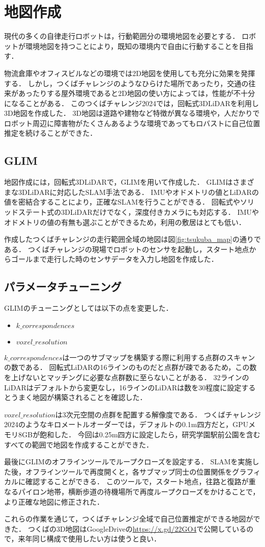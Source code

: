 \section{地図作成}
現代の多くの自律走行ロボットは，行動範囲分の環境地図を必要とする．
ロボットが環境地図を持つことにより，既知の環境内で自由に行動することを目指す．

物流倉庫やオフィスビルなどの環境では2D地図を使用しても充分に効果を発揮する．
しかし，つくばチャレンジのようなひらけた場所であったり，交通の往来があったりする屋外環境であると2D地図の使い方によっては，性能が不十分になることがある．
このつくばチャレンジ2024では，回転式3DLiDARを利用し3D地図を作成した．
3D地図は道路や建物など特徴が異なる環境や，人だかりでロボット周辺に障害物がたくさんあるような環境であってもロバストに自己位置推定を続けることができた．

\subsection{GLIM}
地図作成には，回転式3DLiDARで，GLIM\cite{GLIM}を用いて作成した．
GLIMはさまざまな3DLiDARに対応したSLAM手法である．
IMUやオドメトリの値とLiDARの値を密結合することにより，正確なSLAMを行うことができる．
回転式やソリッドステート式の3DLiDARだけでなく，深度付きカメラにも対応する．
IMUやオドメトリの値の有無も選ぶことができるため，利用の敷居はとても低い．

作成したつくばチャレンジの走行範囲全域の地図は図\ref{fig:tsukuba_map}の通りである．
つくばチャレンジの現場でロボットのセンサを起動し，スタート地点からゴールまで走行した時のセンサデータを入力し地図を作成した．

\subsection{パラメータチューニング}
GLIMのチューニングとしては以下の点を変更した．
\begin{itemize}
    \item $k\_correspondences$
    \item $voxel\_resolution$
\end{itemize}

$k\_correspondences$は一つのサブマップを構築する際に利用する点群のスキャンの数である．
回転式LiDARの16ラインのものだと点群が疎であるため，この数を上げないとマッチングに必要な点群数に至らないことがある．
32ラインのLiDARはデフォルトから変更なし，16ラインのLiDARは数を30程度に設定するとうまく地図が構築されることを確認した．

$voxel\_resolution$は3次元空間の点群を配置する解像度である．
つくばチャレンジ2024のようなキロメートルオーダーでは，デフォルトの0.1m四方だと，GPUメモリ8GBが飽和した．
今回は0.25m四方に設定したら，研究学園駅前公園を含むすべての範囲で地図を作成することができた．

最後にGLIMのオフラインツールでループクローズを設定する．
SLAMを実施した後，オフラインツールで再度開くと，各サブマップ同士の位置関係をグラフィカルに確認することができる．
このツールで，スタート地点，往路と復路が重なるパイロン地帯，横断歩道の待機場所で再度ループクローズをかけることで，より正確な地図に修正された．

これらの作業を通じて，つくばチャレンジ全域で自己位置推定ができる地図ができた．
つくばの3D地図はGoogleDriveの\url{https://x.gd/22GO4}で公開しているので，来年同じ構成で使用したい方は使うと良い．